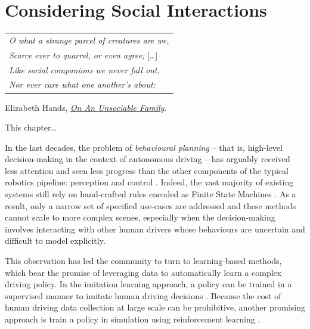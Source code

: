 
\graphicspath{{2-Chapters/4-Chapter/}}


\chapter{Considering Social Interactions}
\label{chapter:4}


\begin{flushright}
	\begin{tabular}{@{}l@{}}
		\emph{O what a strange parcel of creatures are we,}\\
		\emph{Scarce ever to quarrel, or even agree;} [\dots]\\
		\emph{Like social companions we never fall out,}\\
		\emph{Nor ever care what one another’s about;}\\
	\end{tabular}
	
	Elizabeth Hands, \href{https://eleurent.github.io/sisyphe/texts/unsociable_family.html}{\emph{On An Unsociable Family}}.
\end{flushright}

\abstractStartChapter{}%
This chapter\dots
\minitocStartChapter{}


In the last decades, the problem of \emph{behavioural planning} -- that is, high-level decision-making in the context of autonomous driving -- has arguably received less attention and seen less progress than the other components of the typical robotics pipeline: perception and control \citep{Gonzalez2016}. Indeed, the vast majority of existing systems still rely on hand-crafted rules encoded as Finite State Machines \citep{Paden2016}. As a result, only a narrow set of specified use-cases are addressed and these methods cannot scale to more complex scenes, especially when the decision-making involves interacting with other human drivers whose behaviours are uncertain and difficult to model explicitly.

This observation has led the community to turn to learning-based methods, which bear the promise of leveraging data to automatically learn a complex driving policy. In the imitation learning approach, a policy can be trained in a supervised manner to imitate human driving decisions \citep[e.g.][]{Pomerleau1989, Ross2011, Bojarski2016, Xu2016, Eraqi2017, Codevilla2017, Rehder2017c, Rezagholiradeh2018, Rhinehart2018, Bansal2018, Rhinehart2019}. Because the cost of human driving data collection at large scale can be prohibitive, another promising approach is train a policy in simulation using reinforcement learning \citep[e.g.][]{Cardamone2009, Ross2011, Mukadam2017, Chen2017, Isele2018, Ha2018, Kendall2019}.

